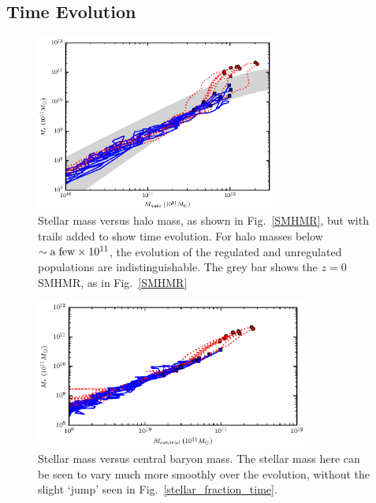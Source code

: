 \subsection{Time Evolution} 
\begin{figure}
    \includegraphics[width=0.7\textwidth]{figures3/SMHMR_time.eps}
    \caption[Stellar mass vs. halo mass evolution in MUGS2]{Stellar mass versus
    halo mass, as shown in Fig.~\ref{SMHMR}, but with trails added to show time
    evolution.  For halo masses below $\sim\rm{a\;few}\times10^{11}$, the
    evolution of the regulated and unregulated populations are
    indistinguishable.  The grey bar shows the $z=0$ SMHMR, as in
    Fig.~\ref{SMHMR}}
    \label{SMHMR_time}
\end{figure}
\begin{figure}
    \includegraphics[width=0.8\textwidth]{figures3/stellar_central_time.eps}
    \caption[Stellar mass vs. central baryonic mass evolution in MUGS2]{Stellar
    mass versus central baryon mass. The stellar mass here can be seen to vary
    much more smoothly over the evolution, without the slight `jump' seen in
    Fig.~\ref{stellar_fraction_time}.}
    \label{stellar_central_time}
\end{figure}

